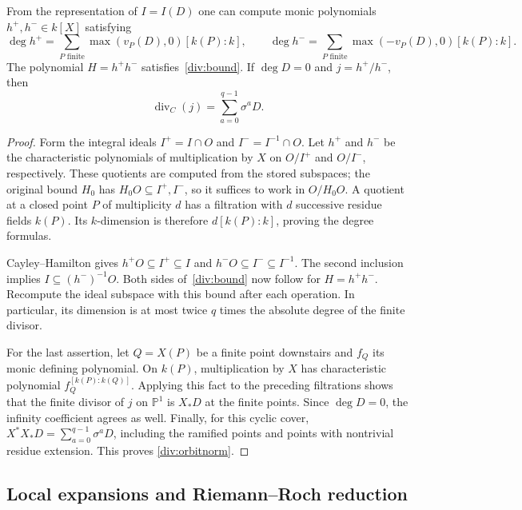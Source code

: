 \begin{lemma}\label{div:compression}
From the representation of $I=I(D)$ one can compute monic polynomials
$h^+,h^-\in k[X]$ satisfying
\[
 \deg h^+=\sum_{P\text{ finite}}\max(v_P(D),0)[k(P):k],\qquad
 \deg h^-=\sum_{P\text{ finite}}\max(-v_P(D),0)[k(P):k].
\]
The polynomial $H=h^+h^-$ satisfies~\eqref{div:bound}.  If $\deg D=0$ and
$j=h^+/h^-$, then
\begin{equation}\label{div:orbitnorm}
 \operatorname{div}_C(j)=\sum_{a=0}^{q-1}\sigma^aD.
\end{equation}
\end{lemma}

\begin{proof}
Form the integral ideals
$I^+=I\cap O$ and $I^-=I^{-1}\cap O$.  Let $h^+$ and $h^-$ be the
characteristic polynomials of multiplication by $X$ on $O/I^+$ and
$O/I^-$, respectively.  These quotients are computed from the stored
subspaces; the original bound $H_0$ has $H_0O\subseteq I^+,I^-$, so it
suffices to work in $O/H_0O$.  A quotient at a closed point $P$ of
multiplicity $d$ has a filtration with $d$ successive residue fields
$k(P)$.  Its $k$-dimension is therefore $d[k(P):k]$, proving the degree
formulas.

Cayley--Hamilton gives $h^+O\subseteq I^+\subseteq I$ and
$h^-O\subseteq I^-\subseteq I^{-1}$.  The second inclusion implies
$I\subseteq(h^-)^{-1}O$.  Both sides of~\eqref{div:bound} now follow
for $H=h^+h^-$.  Recompute the ideal subspace with this bound after each
operation.  In particular, its dimension is at most twice $q$ times the
absolute degree of the finite divisor.

For the last assertion, let $Q=X(P)$ be a finite point downstairs and
$f_Q$ its monic defining polynomial.  On $k(P)$, multiplication by $X$
has characteristic polynomial $f_Q^{[k(P):k(Q)]}$.  Applying this fact to
the preceding filtrations shows that the finite divisor of $j$ on
$\mathbb P^1$ is $X_*D$ at the finite points.  Since $\deg D=0$, the
infinity coefficient agrees as well.  Finally, for this cyclic cover,
$X^*X_*D=\sum_{a=0}^{q-1}\sigma^aD$, including the ramified points and
points with nontrivial residue extension.  This proves
\eqref{div:orbitnorm}.
\end{proof}

\subsection{Local expansions and Riemann--Roch reduction}

